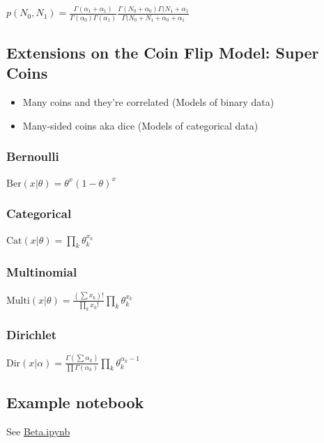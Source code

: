 \documentclass{article}
\begin{document}
$p(N_0, N_1) = \frac{\Gamma( \alpha_1 +  \alpha_1)}{\Gamma(\alpha_0)\Gamma(\alpha_1)} \frac{\Gamma(N_0 + \alpha_0)\Gamma(N_1 + \alpha_1}{\Gamma(N_0 + N_1 + \alpha_0 + \alpha_1}$

\subsection{Extensions on the Coin Flip Model: Super Coins}
\begin{itemize}
\item Many coins and they're correlated (Models of binary data)
\item Many-sided coins aka dice (Models of categorical data)
\end{itemize}

\subsubsection*{Bernoulli}
$\textrm{Ber}(x|\theta) = \theta^{x}(1-\theta)^x$
\subsubsection*{Categorical}
$\textrm{Cat}(x|\theta) = \prod_k\theta_k^{x_k}$
\subsubsection*{Multinomial}
$\textrm{Multi}(x|\theta) = \frac{(\sum x_k) !}{\prod_k x_k!}\prod_k\theta_k^{x_k}$
\subsubsection*{Dirichlet}
$\textrm{Dir}(x|\alpha) = \frac{\Gamma(\sum \alpha_k)}{\prod \Gamma(\alpha_k)}\prod_k\theta_k^{\alpha_k-1}$

\subsection{Example notebook}
See \href{https://github.com/harvard-ml-courses/cs281-demos/blob/master/Beta.ipynb}{Beta.ipynb}
\end{document}
